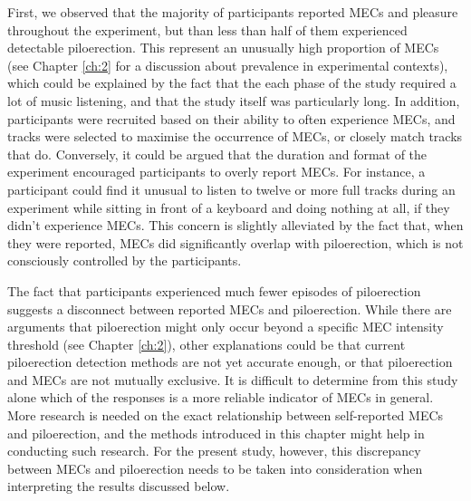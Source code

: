 First, we observed that the majority of participants reported MECs and pleasure throughout the experiment, but than less than half of them experienced detectable piloerection. This represent an unusually high proportion of MECs (see Chapter \ref{ch:2} for a discussion about prevalence in experimental contexts), which could be explained by the fact that the each phase of the study required a lot of music listening, and that the study itself was particularly long. In addition, participants were recruited based on their ability to often experience MECs, and tracks were selected to maximise the occurrence of MECs, or closely match tracks that do. Conversely, it could be argued that the duration and format of the experiment encouraged participants to overly report MECs. For instance, a participant could find it unusual to listen to twelve or more full tracks during an experiment while sitting in front of a keyboard and doing nothing at all, if they didn't experience MECs. This concern is slightly alleviated by the fact that, when they were reported, MECs did significantly overlap with piloerection, which is not consciously controlled by the participants.

The fact that participants experienced much fewer episodes of piloerection suggests a disconnect between reported MECs and piloerection. While there are arguments that piloerection might only occur beyond a specific MEC intensity threshold (see Chapter \ref{ch:2}), other explanations could be that current piloerection detection methods are not yet accurate enough, or that piloerection and MECs are not mutually exclusive. It is difficult to determine from this study alone which of the responses is a more reliable indicator of MECs in general. More research is needed on the exact relationship between self-reported MECs and piloerection, and the methods introduced in this chapter might help in conducting such research. For the present study, however, this discrepancy between MECs and piloerection needs to be taken into consideration when interpreting the results discussed below.


